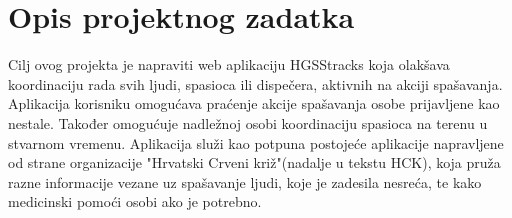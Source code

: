 \chapter{Opis projektnog zadatka}
		{Cilj ovog projekta je napraviti web aplikaciju HGSStracks koja olakšava koordinaciju rada svih ljudi, spasioca ili dispečera, aktivnih na akciji spašavanja. Aplikacija korisniku omogućava praćenje akcije spašavanja osobe prijavljene kao nestale. Također omogućuje nadležnoj osobi koordinaciju spasioca na terenu u stvarnom vremenu. Aplikacija služi kao potpuna postojeće aplikacije napravljene od strane organizacije "Hrvatski Crveni križ"(nadalje u tekstu HCK), koja pruža razne informacije vezane uz spašavanje ljudi, koje je zadesila nesreća, te kako medicinski pomoći osobi ako je potrebno.\\
			\begin{figure}[h!]
				\centering
				\begin{subfigure}[b]{0.3\linewidth}
					\centering

\end{subfigure}
\end{figure}}

